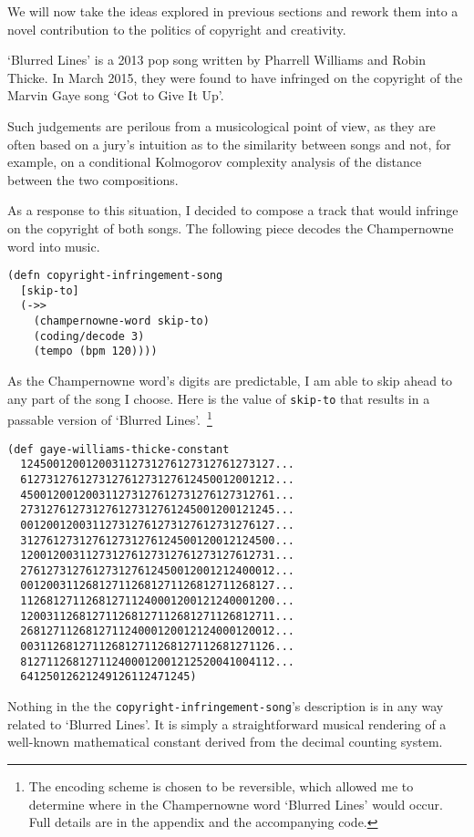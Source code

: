 \documentclass[numbers]{sigplanconf}
\begin{document}
We will now take the ideas explored in previous sections and rework them into a novel contribution to the politics of
copyright and creativity.

`Blurred Lines' is a 2013 pop song written by Pharrell Williams and Robin Thicke\cite{Blurred Lines}. In March 2015,
they were found to have infringed on the copyright of the Marvin Gaye song
`Got to Give It Up'\cite{Got to Give It Up, USA Today}.

Such judgements are perilous from a musicological point of view, as they are often based on a jury's intuition as to
the similarity between songs and not, for example, on a conditional Kolmogorov complexity analysis of the distance between
the two compositions.

As a response to this situation, I decided to compose a track that would infringe on the copyright of both songs. The following
piece decodes the Champernowne word into music.

\begin{verbatim}
(defn copyright-infringement-song
  [skip-to]
  (->>
    (champernowne-word skip-to)
    (coding/decode 3)
    (tempo (bpm 120))))
\end{verbatim}

As the Champernowne word's digits are predictable, I am able to skip ahead to any part of the song I choose. Here
is the value of \verb|skip-to| that results in a passable version of `Blurred Lines'.~\footnote{The encoding scheme is chosen
to be reversible, which allowed me to determine where in the Champernowne word `Blurred Lines' would occur. Full details are in the appendix and the accompanying code.}

\begin{verbatim}
(def gaye-williams-thicke-constant
  124500120012003112731276127312761273127...
  612731276127312761273127612450012001212...
  450012001200311273127612731276127312761...
  273127612731276127312761245001200121245...
  001200120031127312761273127612731276127...
  312761273127612731276124500120012124500...
  120012003112731276127312761273127612731...
  276127312761273127612450012001212400012...
  001200311268127112681271126812711268127...
  112681271126812711240001200121240001200...
  120031126812711268127112681271126812711...
  268127112681271124000120012124000120012...
  003112681271126812711268127112681271126...
  812711268127112400012001212520041004112...
  64125012621249126112471245)
\end{verbatim}

Nothing in the the \verb|copyright-infringement-song|'s description is in any way related to `Blurred Lines'.
It is simply a straightforward musical rendering of a well-known mathematical constant derived from the decimal counting
system.
\end{document}
